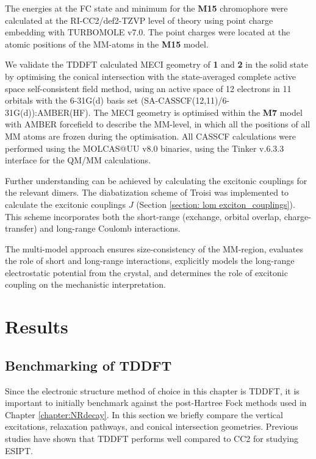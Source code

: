 The energies at the FC state and \Kstar{} minimum for the \textbf{M15} chromophore were calculated at the RI-CC2/def2-TZVP level of theory using point charge embedding with TURBOMOLE v7.0.\cite{Hattig2002,Turbomole} The point charges were located at the atomic positions of the MM-atoms in the \textbf{M15} model.

We validate the TDDFT calculated MECI geometry of \textbf{1} and \textbf{2} in the solid state by optimising the conical intersection with the state-averaged complete active space self-consistent field  method, using an active space of 12 electrons in 11 orbitals with the 6-31G(d) basis set (SA-CASSCF(12,11)/6-31G(d)):AMBER(HF). The MECI geometry is optimised within the \textbf{M7} model with AMBER forcefield to describe the MM-level, in which all the positions of all MM atoms are frozen during the optimisation. All CASSCF calculations were performed using the MOLCAS@UU v8.0 binaries, using  the Tinker v.6.3.3 interface for the QM/MM calculations. 

Further understanding can be achieved by calculating the excitonic couplings for the relevant dimers. The diabatization scheme of Troisi was implemented to calculate the excitonic couplings $J$ (Section \ref{section: lom exciton_couplings}).\cite{Arago2015} This scheme incorporates both the short-range (exchange, orbital overlap, charge-transfer) and long-range Coulomb interactions. 

The multi-model approach ensures size-consistency of the MM-region, evaluates the role of short and long-range interactions, explicitly models the long-range electrostatic potential from the crystal, and determines the role of excitonic coupling on the mechanistic interpretation.
\section{Results}\label{section: Inter_Results}
\subsection{Benchmarking of TDDFT}\label{section: Inter_benchmark}
Since the electronic structure method of choice in this chapter is \ac{TDDFT}, it is important to initially benchmark against the post-Hartree Fock methods used in Chapter \ref{chapter:NRdecay}. In this section we briefly compare the vertical excitations, relaxation pathways, and conical intersection geometries. Previous studies have shown that TDDFT performs well compared to CC2 for studying ESIPT.\cite{Aquino2005}

